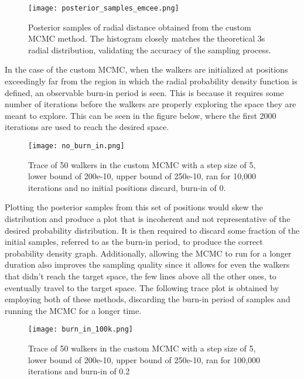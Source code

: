 \documentclass[twocolumn, 11pt]{article}
\begin{document}
\begin{figure}[h!]
    \centering
    \texttt{[image: posterior\_samples\_emcee.png]}
    \caption{Posterior samples of radial distance obtained from the custom MCMC method. The histogram closely matches the theoretical 3s radial distribution, validating the accuracy of the sampling process.}
    \label{fig:posterior_samples}
\end{figure}



In the case of the custom MCMC, when the walkers are initialized at positions exceedingly far from the region in which the radial probability density function is defined, an observable burn-in period is seen. This is because it requires some number of iterations before the walkers are properly exploring the space they are meant to explore. This can be seen in the figure below, where the first 2000 iterations are used to reach the desired space.

\begin{figure}[h!]
    \centering
    \texttt{[image: no\_burn\_in.png]}
    \caption{Trace of 50 walkers in the custom MCMC with a step size of 5, lower bound of 200e-10, upper bound of 250e-10, ran for 10,000 iterations and no initial positions discard, burn-in of 0.}
\end{figure}

Plotting the posterior samples from this set of positions would skew the distribution and produce a plot that is incoherent and not representative of the desired probability distribution. It is then required to discard some fraction of the initial samples, referred to as the burn-in period, to produce the correct probability density graph. Additionally, allowing the MCMC to run for a longer duration also improves the sampling quality since it allows for even the walkers that didn't reach the target space, the few lines above all the other ones, to eventually travel to the target space. The following trace plot is obtained by employing both of these methods, discarding the burn-in period of samples and running the MCMC for a longer time.

\begin{figure}[h!]
    \centering
    \texttt{[image: burn\_in\_100k.png]}
    \caption{Trace of 50 walkers in the custom MCMC with a step size of 5, lower bound of 200e-10, upper bound of 250e-10, ran for 100,000 iterations and burn-in of 0.2}
\end{figure}
\end{document}
